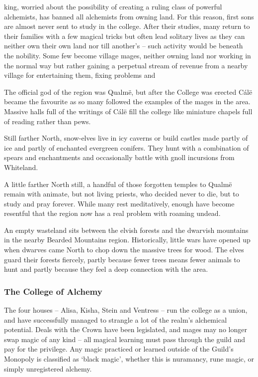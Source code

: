 \begin{multicols}{2}
\Gls{king}, worried about the possibility of creating a ruling class of powerful alchemists, has banned all alchemists from owning land.
For this reason, first sons are almost never sent to study in the college.
After their studies, many return to their families with a few magical tricks but often lead solitary lives as they can neither own their own land nor till another's -- such activity would be beneath the nobility.
Some few become village mages, neither owning land nor working in the normal way but rather gaining a perpetual stream of revenue from a nearby village for entertaining them, fixing problems and 

The official god of the region was Qualm\"{e}, but after the College was erected C\'{a}l\"{e} became the favourite as so many followed the examples of the mages in the area.
Massive halls full of the writings of C\'{a}l\"{e} fill the college like miniature chapels full of reading rather than pews.

Still farther North, snow-elves live in icy caverns or build castles made partly of ice and partly of enchanted evergreen conifers.
They hunt with a combination of spears and enchantments and occasionally battle with gnoll incursions from Whiteland.

A little farther North still, a handful of those forgotten temples to Qualm\"{e} remain with animate, but not living priests, who decided never to die, but to study and pray forever.
While many rest meditatively, enough have become resentful that the region now has a real problem with roaming undead.

An empty wasteland sits between the elvish forests and the dwarvish mountains in the nearby Bearded Mountains region.
Historically, little wars have opened up when dwarves came North to chop down the massive trees for wood.
The elves guard their forests fiercely, partly because fewer trees means fewer animals to hunt and partly because they feel a deep connection with the area.

\subsubsection{The College of Alchemy}

The four houses -- Alisa, Kisha, Stein and Ventress -- run the college as a union, and have successfully managed to strangle a lot of the realm's alchemical potential.
Deals with the Crown have been legislated, and mages may no longer swap magic of any kind -- all magical learning must pass through the guild and pay for the privilege.
Any magic practiced or learned outside of the Guild's Monopoly is classified as `black magic', whether this is nuramancy, rune magic, or simply unregistered alchemy.


\end{multicols}
